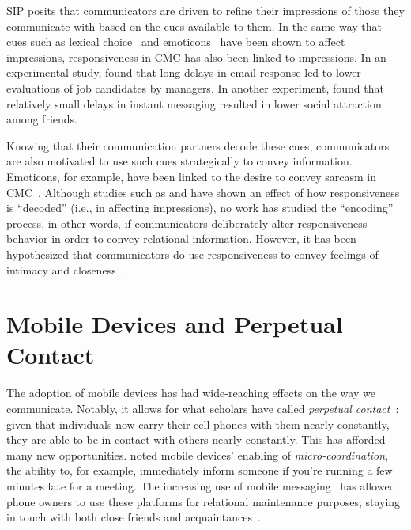 \documentclass[12pt]{nuthesis}	%
\begin{document}
SIP posits that communicators are driven to refine their impressions of those they communicate with based on the cues available to them. In the same way that cues such as lexical choice~\citep{muir2017linguistic,nguyen2016effects} and emoticons~\citep{tossell2012longitudinal, walther2001impacts} have been shown to affect impressions, responsiveness in CMC has also been linked to impressions. In an experimental study, \citet{kalman2011online} found that long delays in email response led to lower evaluations of job candidates by managers. In another experiment, \citet{heston2017worth} found that relatively small delays in instant messaging resulted in lower social attraction among friends.

Knowing that their communication partners decode these cues, communicators are also motivated to use such cues strategically to convey information. Emoticons, for example, have been linked to the desire to convey sarcasm in CMC~\citep{wolf2000emotional}. Although studies such as \citet{kalman2011online} and \citet{heston2017worth} have shown an effect of how responsiveness is ``decoded'' (i.e., in affecting impressions), no work has studied the ``encoding'' process, in other words, if communicators deliberately alter responsiveness behavior in order to convey relational information. However, it has been hypothesized that communicators do use responsiveness to convey feelings of intimacy and closeness~\citep{kalman2006pauses,walther1995nonverbal}.

\section{Mobile Devices and Perpetual Contact}

The adoption of mobile devices has had wide-reaching effects on the way we communicate. Notably, it allows for what scholars have called \textit{perpetual contact}~\citep{katz2002perpetual}: given that individuals now carry their cell phones with them nearly constantly, they are able to be in contact with others nearly constantly. This has afforded many new opportunities. \citet{ling200210} noted mobile devices' enabling of \textit{micro-coordination}, the ability to, for example, immediately inform someone if you're running a few minutes late for a meeting. The increasing use of mobile messaging~\citep{duggan2015mobile,smith2015us} has allowed phone owners to use these platforms for relational maintenance purposes, staying in touch with both close friends and acquaintances~\citep{pettegrew2015smart}.
\end{document}
